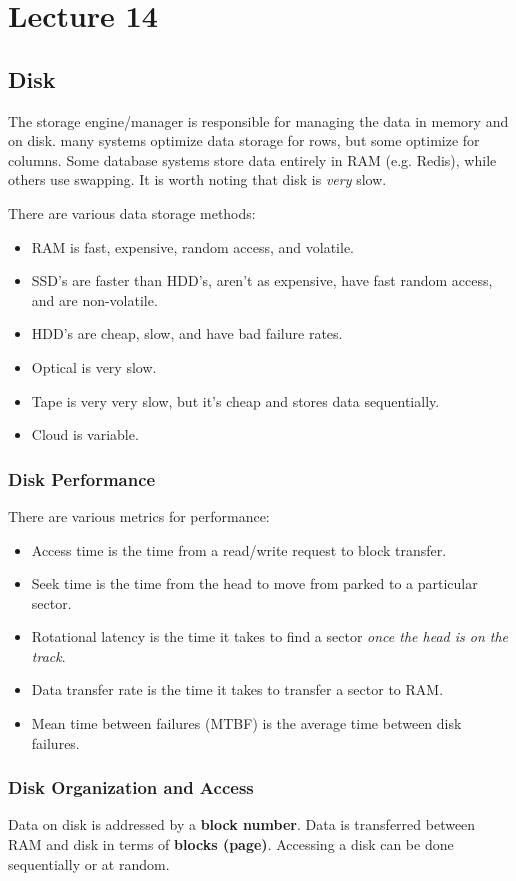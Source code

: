 \documentclass{report}
\renewcommand{\bf}[1]{\textbf{{#1}}}
\renewcommand{\it}[1]{\textit{{#1}}}
\begin{document}
\chapter{Lecture 14}
\section{Disk}
The storage engine/manager is responsible for managing the data in memory and on
disk. many systems optimize data storage for rows, but some optimize for
columns. Some database systems store data entirely in RAM (e.g. Redis), while
others use swapping. It is worth noting that disk is \it{very} slow.

There are various data storage methods:
\begin{itemize}[label=$\to$]
    \item RAM is fast, expensive, random access, and volatile.
    \item SSD's are faster than HDD's, aren't as expensive, have fast random
        access, and are non-volatile.
    \item HDD's are cheap, slow, and have bad failure rates.
    \item Optical is very slow.
    \item Tape is very very slow, but it's cheap and stores data sequentially.
    \item Cloud is variable.
\end{itemize}

\subsection{Disk Performance}
There are various metrics for performance:
\begin{itemize}[label=$\to$]
    \item Access time is the time from a read/write request to block transfer.
    \item Seek time is the time from the head to move from parked to a
        particular sector.
    \item Rotational latency is the time it takes to find a sector
        \it{once the head is on the track}.
    \item Data transfer rate is the time it takes to transfer a sector to RAM.
    \item Mean time between failures (MTBF) is the average time between disk failures.
\end{itemize}

\subsection{Disk Organization and Access}
Data on disk is addressed by a \bf{block number}. Data is transferred between
RAM and disk in terms of \bf{blocks (page)}. Accessing a disk can be done
sequentially or at random.
\end{document}
